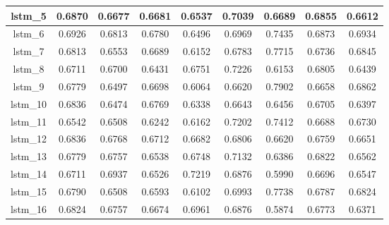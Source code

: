 \begin{table}[p]
\begin{tabular}{|c|c|c|c|c|c|c|c|c|}
        lstm\_5  & 0.6870                        & 0.6677                         & 0.6681                      & 0.6537                  & 0.7039 & 0.6689 & 0.6855 & 0.6612 \\ \hline
        lstm\_6  & 0.6926                        & 0.6813                         & 0.6780                      & 0.6496                  & 0.6969 & 0.7435 & 0.6873 & 0.6934 \\ \hline
        lstm\_7  & 0.6813                        & 0.6553                         & 0.6689                      & 0.6152                  & 0.6783 & 0.7715 & 0.6736 & 0.6845 \\ \hline
        lstm\_8  & 0.6711                        & 0.6700                         & 0.6431                      & 0.6751                  & 0.7226 & 0.6153 & 0.6805 & 0.6439 \\ \hline
        lstm\_9  & 0.6779                        & 0.6497                         & 0.6698                      & 0.6064                  & 0.6620 & 0.7902 & 0.6658 & 0.6862 \\ \hline
        lstm\_10 & 0.6836                        & 0.6474                         & 0.6769                      & 0.6338                  & 0.6643 & 0.6456 & 0.6705 & 0.6397 \\ \hline
        lstm\_11 & 0.6542                        & 0.6508                         & 0.6242                      & 0.6162                  & 0.7202 & 0.7412 & 0.6688 & 0.6730 \\ \hline
        lstm\_12 & 0.6836                        & 0.6768                         & 0.6712                      & 0.6682                  & 0.6806 & 0.6620 & 0.6759 & 0.6651 \\ \hline
        lstm\_13 & 0.6779                        & 0.6757                         & 0.6538                      & 0.6748                  & 0.7132 & 0.6386 & 0.6822 & 0.6562 \\ \hline
        lstm\_14 & 0.6711                        & 0.6937                         & 0.6526                      & 0.7219                  & 0.6876 & 0.5990 & 0.6696 & 0.6547 \\ \hline
        lstm\_15 & 0.6790                        & 0.6508                         & 0.6593                      & 0.6102                  & 0.6993 & 0.7738 & 0.6787 & 0.6824 \\ \hline
        lstm\_16 & 0.6824                        & 0.6757                         & 0.6674                      & 0.6961                  & 0.6876 & 0.5874 & 0.6773 & 0.6371 \\ \hline

\end{tabular}
\end{table}
